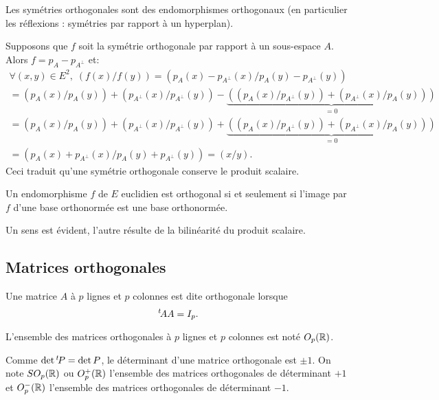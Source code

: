 \begin{exple}
 Les symétries orthogonales sont des endomorphismes orthogonaux (en particulier les réflexions : symétries par rapport à un hyperplan).
\end{exple}
\begin{demo}
  Supposons que $f$ soit la symétrie orthogonale par rapport à un sous-espace $A$. Alors $f = p_A - p_{A^{\bot}}$ et:
  \begin{multline*}
\forall (x,y)\in E^2, \;
(f(x)/f(y)) = (p_{A}(x) - p_{A^{\bot}}(x) /p_{A}(y) - p_{A^{\bot}}(y)) \\
= (p_{A}(x) /p_{A}(y)) + (p_{A^{\bot}}(x) /p_{A^{\bot}}(y)) 
   -  \underset{ = 0}{\underbrace{\left( (p_{A}(x) /p_{A^{\bot}}(y)) + (p_{A^{\bot}}(x) /p_{A}(y))\right)}} \\ 
= (p_{A}(x) /p_{A}(y)) + (p_{A^{\bot}}(x) /p_{A^{\bot}}(y)) 
   +  \underset{ = 0}{\underbrace{\left( (p_{A}(x) /p_{A^{\bot}}(y)) + (p_{A^{\bot}}(x) /p_{A}(y))\right)}} \\ 
= (p_{A}(x) + p_{A^{\bot}}(x) /p_{A}(y) + p_{A^{\bot}}(y)) = (x/y). 
   \end{multline*}
Ceci traduit qu'une symétrie orthogonale conserve le produit scalaire.
\end{demo}

\begin{prop}
 Un endomorphisme $f$ de $E$ euclidien est orthogonal si et seulement si l'image par $f$ d'une base orthonormée est une base orthonormée.
\end{prop}
\begin{demo}
 Un sens est évident, l'autre résulte de la bilinéarité du produit scalaire.
\end{demo}


\subsection{Matrices orthogonales}
\begin{defi}
 Une matrice $A$ à $p$ lignes et $p$ colonnes est dite orthogonale lorsque
\begin{displaymath}
 \mathstrut^t\! A A = I_p .
\end{displaymath}
\end{defi}
\begin{nota}
 L'ensemble des matrices orthogonales à $p$ lignes et $p$ colonnes est noté $O_p(\mathbb{R})$.
\end{nota}
\begin{rem}
 Comme $\det \mathstrut^t\! P = \det P$, le déterminant d'une matrice orthogonale est $\pm 1$. On note $SO_p(\mathbb{R})$ ou $O_{p}^+(\mathbb{R})$ l'ensemble des matrices orthogonales de déterminant $+1$ et $O_{p}^{-}(\mathbb{R})$ l'ensemble des matrices orthogonales de déterminant $-1$.
\end{rem}

